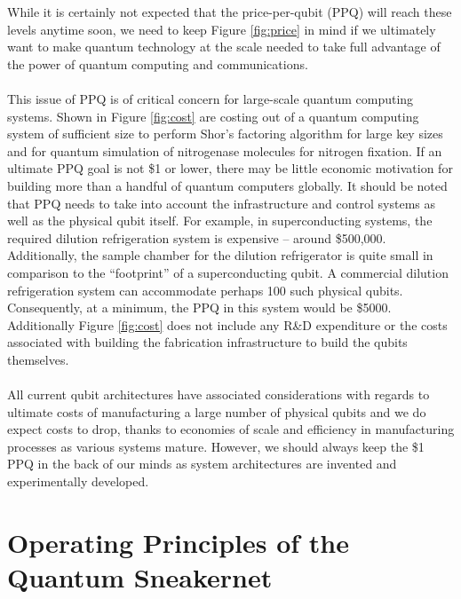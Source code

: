 \documentclass[aps,prl,twocolumn,10pt,nofootinbib]{revtex4}
\begin{document}
While it is certainly not expected that the price-per-qubit (PPQ) will reach these levels anytime soon, we need to keep Figure \ref{fig:price} in mind if we ultimately want to make quantum technology at the scale needed to take full advantage of the power of quantum computing and communications.  
\\
\\
This issue of PPQ is of critical concern for large-scale quantum computing systems.  Shown in Figure \ref{fig:cost} are costing out of a quantum computing system of sufficient size to perform Shor's factoring algorithm for large key sizes and for quantum simulation of nitrogenase molecules for nitrogen fixation. If an ultimate PPQ goal is not \$1 or lower, there may be little economic motivation for building more than a handful of quantum computers globally.  It should be noted that PPQ needs to take into account the infrastructure and control systems as well as the physical qubit itself. For example, in superconducting systems, the required dilution refrigeration system is expensive -- around \$500,000.  Additionally, the sample chamber for the dilution refrigerator is quite small in comparison to the ``footprint'' of a superconducting qubit.  A commercial dilution refrigeration system can accommodate perhaps 100 such physical qubits.  Consequently, at a minimum, the PPQ in this system would be \$5000.   Additionally Figure \ref{fig:cost} does not include any R\&D expenditure or the costs associated with building the fabrication infrastructure to build the qubits themselves.  
\\
\\
All current qubit architectures have associated considerations with regards to ultimate costs of manufacturing a large number of physical qubits and we do expect costs to drop, thanks to economies of scale and efficiency in manufacturing processes as various systems mature.  However, we should always keep the \$1 PPQ in the back of our minds as system architectures are invented and experimentally developed. 

\section{Operating Principles of the Quantum Sneakernet}
\end{document}

